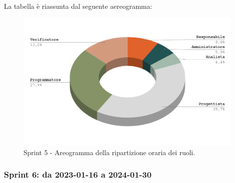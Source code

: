 \documentclass[10pt, a4paper]{article}
\begin{document}
{{{{{{{{{{{{{\paragraph{}La tabella è riassunta dal seguente aereogramma:
 \begin{figure}[H]
        \centering        
        \includegraphics[width=15.5cm]{aereogrammi/areogramma_5_periodo.png}
        \caption{Sprint 5 - Areogramma della ripartizione oraria dei ruoli. }
    \end{figure}





\subsubsection{Sprint 6: da 2023-01-16 a 2024-01-30}
}}}}}}}}}}}}}
\end{document}
